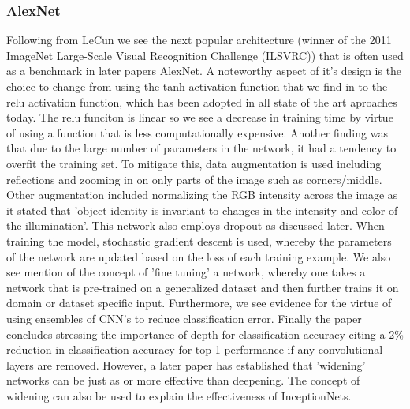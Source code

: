   \subsubsection{AlexNet}
    Following from LeCun we see the next popular architecture (winner of the 2011 ImageNet Large-Scale Visual Recognition Challenge (ILSVRC)) that is often used as a benchmark in later papers AlexNet\citep{Krizhevsky}. A noteworthy aspect of it's design is the choice to change from using the tanh activation function that we find in \citep{LeCun1998} to the relu activation function, which has been adopted in all state of the art aproaches today. The relu funciton is linear so we see a decrease in training time by virtue of using a function that is less computationally expensive. Another finding was that due to the large number of parameters in the network, it had a tendency to overfit the training set. To mitigate this, data augmentation is used including reflections and zooming in on only parts of the image such as corners/middle. Other augmentation included normalizing the RGB intensity across the image as it stated that 'object identity is invariant to changes in the intensity and color of the illumination'. This network also employs dropout as discussed later. When training the model, stochastic gradient descent is used, whereby the parameters of the network are updated based on the loss of each training example. We also see mention of the concept of 'fine tuning' a network, whereby one takes a network that is pre-trained on a generalized dataset and then further trains it on domain or dataset specific input. Furthermore, we see evidence for the virtue of using ensembles of CNN's to reduce classification error. Finally the paper concludes stressing the importance of depth for classification accuracy citing a 2\% reduction in classification accuracy for top-1 performance if any convolutional layers are removed. However, a later paper \citep{Zagoruyko} has established that 'widening' networks can be just as or more effective than deepening. The concept of widening can also be used to explain the effectiveness of InceptionNets.

